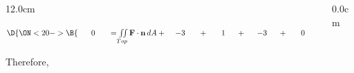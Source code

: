 \begin{frame}
\begin{columns}
\begin{column}{12.0cm}
%

\vspace{0.4cm}

$\D{
\ON<20->{\B{\hspace{0.6cm} 0 \hspace{0.6cm} = \iint \limits_{Top} {\bf F} \cdot {\bf n}\, dA + \hspace{0.4cm} -3 \hspace{0.6cm} + \hspace{0.6cm} 1 \hspace{0.5cm} + \hspace{0.5cm} -3 \hspace{0.5cm} + \hspace{0.6cm} 0 \hspace{0.6cm} + \hspace{0.6cm} 0 }}}$

\vspace{0.2cm}

Therefore, 

\end{column}\begin{column}{0.0cm}\end{column}\end{columns}
\end{frame}
